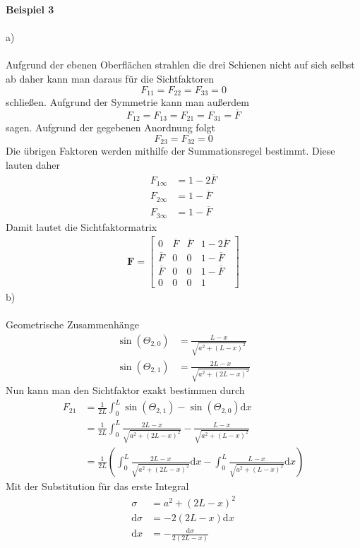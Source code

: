 \textbf{Beispiel 3}\\ \\
a)\\ \\
Aufgrund der ebenen Oberflächen strahlen die drei Schienen nicht auf sich selbst ab daher kann man daraus für die Sichtfaktoren
\[
	F_{11} = F_{22} = F_{33} = 0
\]
schließen. Aufgrund der Symmetrie kann man außerdem 
\[
	F_{12} = F_{13} = F_{21} = F_{31} = \overline{F}
\]
sagen.
Aufgrund der gegebenen Anordnung folgt
\[
	F_{23} = F_{32} = 0
\]
Die übrigen Faktoren werden mithilfe der Summationsregel bestimmt. Diese lauten daher
\begin{align*}
	F_{1\infty} &= 1 - 2\overline{F} \\
	F_{2\infty} &= 1 - \overline{F} \\
	F_{3\infty} &= 1 - \overline{F}
\end{align*}
Damit lautet die Sichtfaktormatrix
\begin{align*}
	\textbf{F} = \begin{bmatrix}
		0 & \overline{F} & \overline{F} & 1 - 2\overline{F} \\
		\overline{F} & 0 & 0 & 1 - \overline{F} \\
		\overline{F} & 0 & 0 & 1 - \overline{F} \\
		0 & 0 & 0 & 1
	\end{bmatrix}
\end{align*}
b)\\ \\
Geometrische Zusammenhänge
\begin{align*}
	\sin(\varTheta_{2,0}) &= \frac{L - x}{\sqrt{a^2 + (L - x)^2}} \\
	\sin(\varTheta_{2,1}) &= \frac{2L - x}{\sqrt{a^2 + (2L - x)^2}}
\end{align*}
Nun kann man den Sichtfaktor exakt bestimmen durch
\begin{align*}
	F_{21} &= \frac{1}{2L}\int_{0}^{L} \sin(\varTheta_{2,1}) - \sin(\varTheta_{2,0}) \text{d}x \\
	       &= \frac{1}{2L}\int_{0}^{L} \frac{2L - x}{\sqrt{a^2 + (2L - x)^2}} - \frac{L - x}{\sqrt{a^2 + (L - x)^2}} \\
	       &= \frac{1}{2L}\left(\int_{0}^{L} \frac{2L - x}{\sqrt{a^2 + (2L - x)^2}} \text{d}x - \int_{0}^{L}\frac{L - x}{\sqrt{a^2 + (L - x)^2}}\text{d}x\right)
\end{align*}
Mit der Substitution für das erste Integral 
\begin{align*}
	\sigma &= a^2 + (2L - x)^2 \\
	\text{d}\sigma &= - 2(2L - x) \text{d}x \\
	\text{d}x &= -\frac{\text{d}\sigma}{2(2L - x) }
\end{align*}
